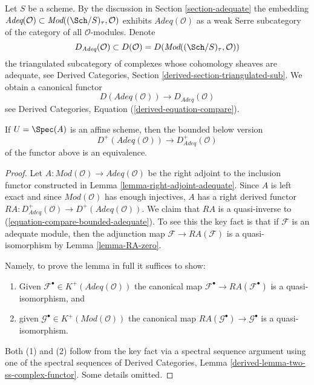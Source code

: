 \noindent
Let $S$ be a scheme. By the discussion in
Section \ref{section-adequate}
the embedding
$\textit{Adeq}(\mathcal{O}) \subset
\textit{Mod}((\Sch/S)_\tau, \mathcal{O})$
exhibits $\textit{Adeq}(\mathcal{O})$ as a weak Serre subcategory of
the category of all $\mathcal{O}$-modules. Denote
$$
D_{\textit{Adeq}}(\mathcal{O}) \subset
D(\mathcal{O}) = D(\textit{Mod}((\Sch/S)_\tau, \mathcal{O}))
$$
the triangulated subcategory of complexes whose cohomology sheaves
are adequate, see
Derived Categories, Section \ref{derived-section-triangulated-sub}.
We obtain a canonical functor
$$
D(\textit{Adeq}(\mathcal{O}))
\longrightarrow
D_{\textit{Adeq}}(\mathcal{O})
$$
see
Derived Categories, Equation (\ref{derived-equation-compare}).

\begin{lemma}
\label{lemma-bounded-below}
If $U = \Spec(A)$ is an affine scheme, then the bounded
below version
\begin{equation}
\label{equation-compare-bounded-adequate}
D^+(\textit{Adeq}(\mathcal{O}))
\longrightarrow
D^+_{\textit{Adeq}}(\mathcal{O})
\end{equation}
of the functor above is an equivalence.
\end{lemma}

\begin{proof}
Let $A : \textit{Mod}(\mathcal{O}) \to \textit{Adeq}(\mathcal{O})$
be the right adjoint to the inclusion functor constructed in
Lemma \ref{lemma-right-adjoint-adequate}.
Since $A$ is left exact and since $\textit{Mod}(\mathcal{O})$
has enough injectives, $A$ has a right derived functor
$RA : D^+_{\textit{Adeq}}(\mathcal{O}) \to D^+(\textit{Adeq}(\mathcal{O}))$.
We claim that $RA$ is a quasi-inverse to
(\ref{equation-compare-bounded-adequate}).
To see this the key fact is that if $\mathcal{F}$ is an adequate module, then
the adjunction map $\mathcal{F} \to RA(\mathcal{F})$ is a
quasi-isomorphism by Lemma \ref{lemma-RA-zero}.

\medskip\noindent
Namely, to prove the lemma in full it suffices to show:
\begin{enumerate}
\item Given $\mathcal{F}^\bullet \in K^+(\textit{Adeq}(\mathcal{O}))$
the canonical map $\mathcal{F}^\bullet \to RA(\mathcal{F}^\bullet)$
is a quasi-isomorphism, and
\item given $\mathcal{G}^\bullet \in K^+(\textit{Mod}(\mathcal{O}))$
the canonical map $RA(\mathcal{G}^\bullet) \to \mathcal{G}^\bullet$
is a quasi-isomorphism.
\end{enumerate}
Both (1) and (2) follow from the key fact via a spectral sequence
argument using one of the spectral sequences of
Derived Categories, Lemma \ref{derived-lemma-two-ss-complex-functor}.
Some details omitted.
\end{proof}

